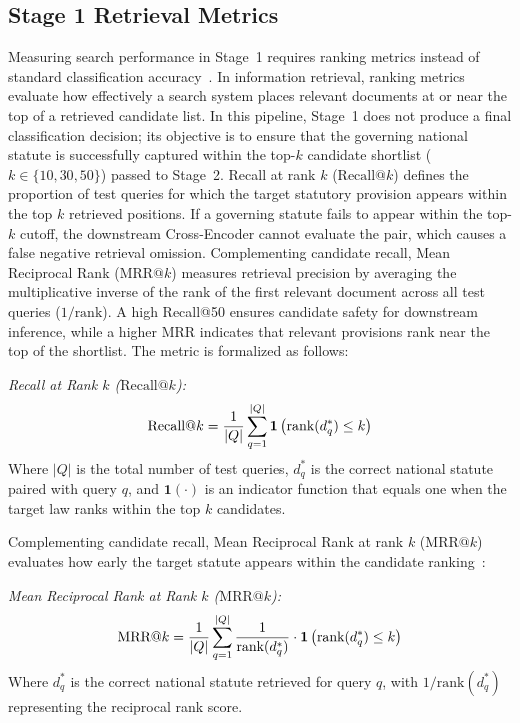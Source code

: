     \subsection{Stage 1 Retrieval Metrics}
    \label{sec:stage1_metrics}
    Measuring search performance in Stage~1 requires ranking metrics instead of standard classification accuracy~\cite{manning2008introduction}. In information retrieval, ranking metrics evaluate how effectively a search system places relevant documents at or near the top of a retrieved candidate list. In this pipeline, Stage~1 does not produce a final classification decision; its objective is to ensure that the governing national statute is successfully captured within the top-$k$ candidate shortlist ($k \in \{10, 30, 50\}$) passed to Stage~2. Recall at rank $k$ ($\text{Recall@}k$) defines the proportion of test queries for which the target statutory provision appears within the top $k$ retrieved positions. If a governing statute fails to appear within the top-$k$ cutoff, the downstream Cross-Encoder cannot evaluate the pair, which causes a false negative retrieval omission. Complementing candidate recall, Mean Reciprocal Rank ($\text{MRR@}k$) measures retrieval precision by averaging the multiplicative inverse of the rank of the first relevant document across all test queries ($1/\text{rank}$). A high Recall@50 ensures candidate safety for downstream inference, while a higher MRR indicates that relevant provisions rank near the top of the shortlist. The metric is formalized as follows:

    \noindent\textit{Recall at Rank $k$ ($\text{Recall@}k$):}
    \begin{equation}
        \text{Recall@}k = \frac{1}{|Q|} \sum_{q=1}^{|Q|} \mathbf{1}\left(\text{rank}(d_q^*) \le k\right)
        \label{eq:recall_at_k}
        \eqcaption{Recall at Rank $k$ ($\text{Recall@}k$)}
    \end{equation}
    \noindent Where $|Q|$ is the total number of test queries, $d_q^*$ is the correct national statute paired with query $q$, and $\mathbf{1}(\cdot)$ is an indicator function that equals one when the target law ranks within the top $k$ candidates.

    Complementing candidate recall, Mean Reciprocal Rank at rank $k$ ($\text{MRR@}k$) evaluates how early the target statute appears within the candidate ranking~\cite{manning2008introduction}:

    \noindent\textit{Mean Reciprocal Rank at Rank $k$ ($\text{MRR@}k$):}
    \begin{equation}
        \text{MRR@}k = \frac{1}{|Q|} \sum_{q=1}^{|Q|} \frac{1}{\text{rank}(d_q^*)} \cdot \mathbf{1}\left(\text{rank}(d_q^*) \le k\right)
        \label{eq:mrr_at_k}
        \eqcaption{Mean Reciprocal Rank at Rank $k$ ($\text{MRR@}k$)}
    \end{equation}
    \noindent Where $d_q^*$ is the correct national statute retrieved for query $q$, with $1/\text{rank}(d_q^*)$ representing the reciprocal rank score.

